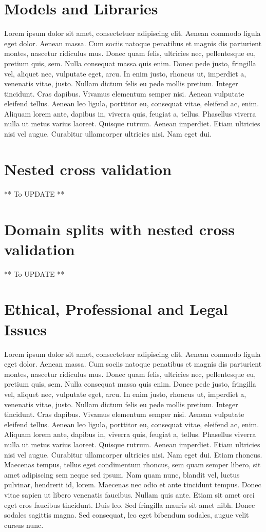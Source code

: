 \section{Models and Libraries}

Lorem ipsum dolor sit amet, consectetuer adipiscing elit. Aenean commodo ligula eget dolor. Aenean massa. Cum sociis natoque penatibus et magnis dis parturient montes, nascetur ridiculus mus. Donec quam felis, ultricies nec, pellentesque eu, pretium quis, sem. Nulla consequat massa quis enim. Donec pede justo, fringilla vel, aliquet nec, vulputate eget, arcu. In enim justo, rhoncus ut, imperdiet a, venenatis vitae, justo. Nullam dictum felis eu pede mollis pretium. Integer tincidunt. Cras dapibus. Vivamus elementum semper nisi. Aenean vulputate eleifend tellus. Aenean leo ligula, porttitor eu, consequat vitae, eleifend ac, enim. Aliquam lorem ante, dapibus in, viverra quis, feugiat a, tellus. Phasellus viverra nulla ut metus varius laoreet. Quisque rutrum. Aenean imperdiet. Etiam ultricies nisi vel augue. Curabitur ullamcorper ultricies nisi. Nam eget dui. 

\section{Nested cross validation}
** To UPDATE **

\section{Domain splits with nested cross validation}
** To UPDATE **

\section{Ethical, Professional and Legal Issues}

Lorem ipsum dolor sit amet, consectetuer adipiscing elit. Aenean commodo ligula eget dolor. Aenean massa. Cum sociis natoque penatibus et magnis dis parturient montes, nascetur ridiculus mus. Donec quam felis, ultricies nec, pellentesque eu, pretium quis, sem. Nulla consequat massa quis enim. Donec pede justo, fringilla vel, aliquet nec, vulputate eget, arcu. In enim justo, rhoncus ut, imperdiet a, venenatis vitae, justo. Nullam dictum felis eu pede mollis pretium. Integer tincidunt. Cras dapibus. Vivamus elementum semper nisi. Aenean vulputate eleifend tellus. Aenean leo ligula, porttitor eu, consequat vitae, eleifend ac, enim. Aliquam lorem ante, dapibus in, viverra quis, feugiat a, tellus. Phasellus viverra nulla ut metus varius laoreet. Quisque rutrum. Aenean imperdiet. Etiam ultricies nisi vel augue. Curabitur ullamcorper ultricies nisi. Nam eget dui. Etiam rhoncus. Maecenas tempus, tellus eget condimentum rhoncus, sem quam semper libero, sit amet adipiscing sem neque sed ipsum. Nam quam nunc, blandit vel, luctus pulvinar, hendrerit id, lorem. Maecenas nec odio et ante tincidunt tempus. Donec vitae sapien ut libero venenatis faucibus. Nullam quis ante. Etiam sit amet orci eget eros faucibus tincidunt. Duis leo. Sed fringilla mauris sit amet nibh. Donec sodales sagittis magna. Sed consequat, leo eget bibendum sodales, augue velit cursus nunc.
